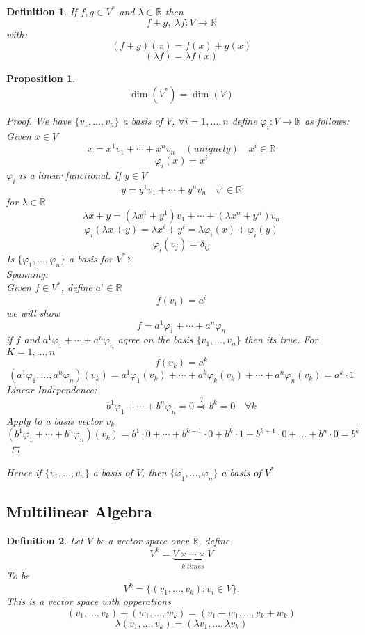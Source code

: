 \documentclass[11pt]{article}
\def\RR{\mathbb{R}}
\newtheorem{definition}{Definition}[section]
\newtheorem{proposition}{Proposition}[section]
\begin{document}
\begin{definition}
If $f,g \in V^{*}$ and $\lambda \in \RR$ then
\[f+g, \; \lambda f:V \rightarrow \RR\]
with:
\[(f+g)(x) = f(x) + g(x)\]
\[(\lambda f)  = \lambda f(x)\] \end{definition}

\begin{proposition}
\[\dim(V^{*}) = \dim(V)\]
\begin{proof}
We have $\{v_1, \dots , v_n\}$ a basis of $V$, $\forall i = 1,\dots , n$ define $\varphi_i:V\rightarrow \RR$ as follows:\\
Given $x\in V$
\[x  = x^1v_1 + \cdots + x^nv_n \quad (uniquely) \quad x^i \in \RR\]
\[\varphi_i(x) = x^i\]
$\varphi_i$ is a linear functional. If $y \in V$
\[y= y^1v_1 + \cdots + y^nv_n \quad v^i \in \RR\] 
for $\lambda \in \RR$
\[ \lambda x + y = (\lambda x^1 + y^1)v_1 + \cdots + (\lambda x^n + y^n)v_n\] 
\[\varphi_i(\lambda x + y) = \lambda x^i + y^i = \lambda\varphi_i(x) + \varphi_i(y)\]
\[\varphi_i(v_j) = \delta_{ij}\]
Is $\{\varphi_1, \dots , \varphi_n\}$ a basis for $V^*$?\\ 
Spanning:\\ Given $f \in V^*$, define $a^i \in \RR$
\[f(v_i) = a^i\]
we will show 
\[f=a^1\varphi_1 + \cdots + a^n\varphi_n\]
if $f$ and $a^1\varphi_1 + \cdots + a^n\varphi_n$ agree on the basis $\{v_1 , \dots , v_n\}$ then its true.
For $K=1,\dots, n$
\[f(v_k) = a^k\]
\[(a^1\varphi_1, \dots ,a^n\varphi_n)(v_k) = a^1\varphi_1(v_k) + \cdots + a^k\varphi_k(v_k) + \cdots + a^n\varphi_n(v_k) = a^k\cdot 1 \]
Linear Independence:\\
\[b^1\varphi_1 + \cdots + b^n\varphi_n = 0 \overset{?}{\Rightarrow} b^k = 0 \quad \forall k\]
Apply to a basis vector $v_k$
\[(b^1\varphi_1 + \cdots + b^n\varphi_n)(v_k) = b^1\cdot 0 +\cdots +b^{k-1}\cdot0 + b^k\cdot 1 + b^{k+1}\cdot 0 + \dots + b^n\cdot 0 = b^k \]
\end{proof}
Hence if $\{v_1, \dots , v_n\}$ a basis of $V$, then $\{\varphi_1, \dots , \varphi_n\}$ a basis of $V^*$
\end{proposition}



\subsection{Multilinear Algebra}



\begin{definition}
Let $V$ be a vector space over $\RR$, define
\[V^k = \underbrace{V \times \cdots \times V}_{k \; times }\]
To be
\[V^k = \{(v_1, \dots, v_k) : v_i \in V \}.\]
This is a vector space with opperations
 \[(v_1, \dots , v_k) + (w_1, \dots , w_k) = (v_1 + w_1, \dots , v_k + w_k)\]
\[\lambda(v_1 , \dots , v_k) = (\lambda v_1 , \dots , \lambda v_k) \]

\end{definition}
\end{document}
